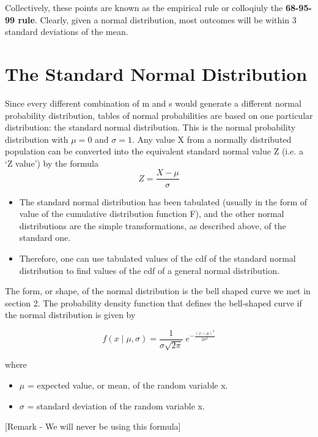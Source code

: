 \documentclass[]{report}
\begin{document}
	
	
	Collectively, these points are known as the empirical rule or colloqiuly the \textbf{68-95-99 rule}. Clearly, given a normal distribution, most outcomes will be within 3 standard deviations of the mean.
	
	

	
\section{The Standard Normal Distribution}

Since every different combination of m and s would generate a different normal
probability distribution, tables of normal probabilities are based on one
particular distribution: the standard normal distribution. This is the normal probability distribution with $\mu=0$
and $\sigma=1$. Any value X from a normally distributed population can be converted into the equivalent standard
normal value Z (i.e. a `Z value') by the formula
\[ Z = \frac{X - \mu}{\sigma}\]


\begin{itemize}
	\item The standard normal distribution has been tabulated (usually in the form of value of the cumulative distribution function F), and the other normal distributions are the simple transformations, as described above, of the standard one. \item Therefore, one can use tabulated values of the cdf of the standard normal distribution to 
	find values of the cdf of a general normal distribution.
\end{itemize}



	

The form, or shape, of the normal distribution is the bell shaped curve we met in section 2.
The probability density function that defines the bell-shaped curve if the normal distribution is given by




\[f(x \; | \; \mu, \sigma) = \frac{1}{\sigma\sqrt{2\pi} } \; e^{ -\frac{(x-\mu)^2}{2\sigma^2} }\]

where 

\begin{itemize}
	\item $\mu$ = expected value, or mean, of the random variable x.
	\item $\sigma$  = standard deviation of the random variable x.
\end{itemize}
[Remark - We will never be using this formula]
\end{document}
